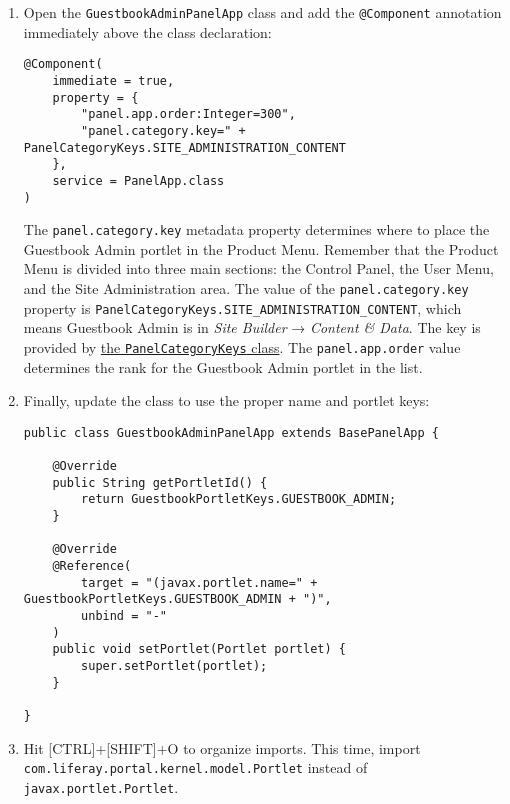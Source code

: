 \begin{enumerate}
\def\labelenumi{\arabic{enumi}.}
\item
  Open the \texttt{GuestbookAdminPanelApp} class and add the
  \texttt{@Component} annotation immediately above the class
  declaration:

\begin{verbatim}
@Component(
    immediate = true,
    property = {
        "panel.app.order:Integer=300",
        "panel.category.key=" + PanelCategoryKeys.SITE_ADMINISTRATION_CONTENT
    },
    service = PanelApp.class
)
\end{verbatim}

  The \texttt{panel.category.key} metadata property determines where to
  place the Guestbook Admin portlet in the Product Menu. Remember that
  the Product Menu is divided into three main sections: the Control
  Panel, the User Menu, and the Site Administration area. The value of
  the \texttt{panel.category.key} property is
  \texttt{PanelCategoryKeys.SITE\_ADMINISTRATION\_CONTENT}, which means
  Guestbook Admin is in \emph{Site Builder} → \emph{Content \& Data}.
  The key is provided by
  \href{https://github.com/liferay/liferay-portal/blob/7.2.x/modules/apps/application-list/application-list-api/src/main/java/com/liferay/application/list/constants/PanelCategoryKeys.java}{the
  \texttt{PanelCategoryKeys} class}. The \texttt{panel.app.order} value
  determines the rank for the Guestbook Admin portlet in the list.
\item
  Finally, update the class to use the proper name and portlet keys:

\begin{verbatim}
public class GuestbookAdminPanelApp extends BasePanelApp {

    @Override
    public String getPortletId() {
        return GuestbookPortletKeys.GUESTBOOK_ADMIN;
    }

    @Override
    @Reference(
        target = "(javax.portlet.name=" + GuestbookPortletKeys.GUESTBOOK_ADMIN + ")",
        unbind = "-"
    )
    public void setPortlet(Portlet portlet) {
        super.setPortlet(portlet);
    }

}
\end{verbatim}
\item
  Hit {[}CTRL{]}+{[}SHIFT{]}+O to organize imports. This time, import
  \texttt{com.liferay.portal.kernel.model.Portlet} instead of
  \texttt{javax.portlet.Portlet}.
\end{enumerate}

